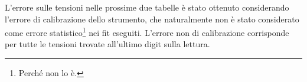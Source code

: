 \documentclass[a4paper,10pt]{article}
\begin{document}
\begin{table}[H]
	\centering
	
	\caption{Valori delle frequenze utilizzate e del potenziale in uscita al circuito utilizzando un partitore 1000:1.}
	\label{tab:totamp}
\end{table}

\pagebreak

L'errore sulle tensioni nelle prossime due tabelle è stato ottenuto considerando l'errore di calibrazione dello strumento, che naturalmente non è stato considerato come errore statistico\footnote{Perché non lo è.} nei fit eseguiti.
L'errore non di calibrazione corrisponde per tutte le tensioni trovate all'ultimo digit sulla lettura.

\begin{table}[H]
	\centering
	
	\caption{.}
	\label{tab:lastfit}
\end{table}

\begin{table}[H]
	\centering
	
	\caption{.}
	\label{tab:lastfit1}
\end{table}
\end{document}
